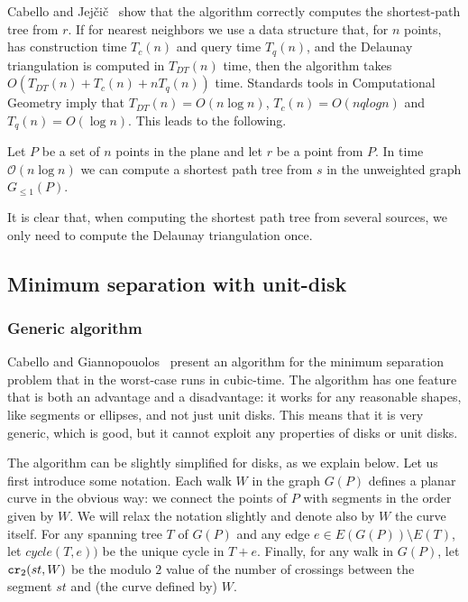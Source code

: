 \documentclass[a4paper,USenglish,numberwithinsect]{lipics}
\newcommand{\GG}{\ensuremath{G_{\le 1}}}
\newcommand{\cycle}{\mathit{cycle}}
\newcommand\CR{\mbox{\tt cr}_2}		  %
\let\le\leqslant
\begin{document}
Cabello and Jej\v{c}i\v{c}~\cite{CJ15} show that the algorithm correctly computes
the shortest-path tree from $r$. 
If for nearest neighbors we use a data structure that,
for $n$ points, has construction time $T_c(n)$ and query time $T_q(n)$, 
and the Delaunay triangulation is computed in $T_{DT}(n)$ time,
then the algorithm takes $O(T_{DT}(n)+ T_c(n)+ n T_q(n))$ time. 
Standards tools in Computational Geometry imply that 
$T_{DT}(n)=O(n\log n)$, $T_c(n)=O(nqlog n)$ and $T_q(n)=O(\log n)$.
This leads to the following.

\begin{theorem}
  Let $P$ be a set of $n$ points in the plane and let $r$ be a point from $P$. 
  In time ${\mathcal O}(n \log n)$ we can compute a shortest path tree from $s$
  in the unweighted graph $\GG(P)$.
\end{theorem}

It is clear that, when computing the shortest path tree from several sources,
we only need to compute the Delaunay triangulation once.

\subsection{Minimum separation with unit-disk}
\label{sec:algorithm-separation}

\subsubsection{Generic algorithm}
Cabello and Giannopouolos~\cite{CG16} present an algorithm
for the minimum separation problem that in the worst-case runs in cubic-time.
The algorithm has one feature that is both an advantage and a disadvantage: 
it works for any reasonable shapes, like segments or ellipses, and not just unit disks.
This means that it is very generic, which is good,
but it cannot exploit any properties of disks or unit disks.

The algorithm can be slightly simplified for disks, as we explain below. 
Let us first introduce some notation.
Each walk $W$ in the graph $G(P)$ defines a planar curve
in the obvious way: we connect the points of $P$ 
with segments in the order given by $W$. 
We will relax the notation slightly and denote also by $W$ the curve itself.
For any spanning tree $T$ of $G(P)$ and any edge $e\in E(G(P))\setminus E(T)$, 
let $\cycle(T,e))$ be the unique cycle in $T+e$.
Finally, for any walk in $G(P)$, let $\CR (st,W)$ be the 
modulo $2$ value of the number of crossings between the segment $st$ 
and (the curve defined by) $W$.
\end{document}
